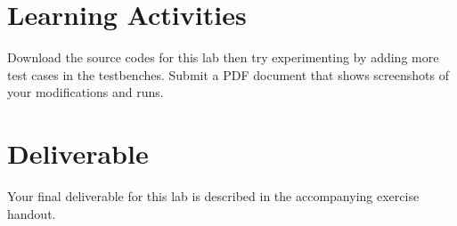 \documentclass[a4paper, 11pt,oneside]{article}
\begin{document}
\section{Learning Activities}
Download the source codes for this lab then try experimenting by adding more 
test cases in the testbenches. Submit a PDF document that shows screenshots of 
your modifications and runs. 

\section{Deliverable}
Your final deliverable for this lab is described in the accompanying exercise handout.




\nocite{*}
\end{document}
